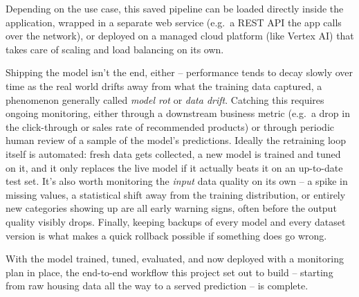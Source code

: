 \documentclass[11pt]{article}
\begin{document}
	Depending on the use case, this saved pipeline can be loaded directly inside the application, wrapped in a separate web service (e.g.\ a REST API the app calls over the network), or deployed on a managed cloud platform (like Vertex AI) that takes care of scaling and load balancing on its own.
	
	Shipping the model isn't the end, either -- performance tends to decay slowly over time as the real world drifts away from what the training data captured, a phenomenon generally called \emph{model rot} or \emph{data drift}. Catching this requires ongoing monitoring, either through a downstream business metric (e.g.\ a drop in the click-through or sales rate of recommended products) or through periodic human review of a sample of the model's predictions. Ideally the retraining loop itself is automated: fresh data gets collected, a new model is trained and tuned on it, and it only replaces the live model if it actually beats it on an up-to-date test set. It's also worth monitoring the \emph{input} data quality on its own -- a spike in missing values, a statistical shift away from the training distribution, or entirely new categories showing up are all early warning signs, often before the output quality visibly drops. Finally, keeping backups of every model and every dataset version is what makes a quick rollback possible if something does go wrong.
	
	With the model trained, tuned, evaluated, and now deployed with a monitoring plan in place, the end-to-end workflow this project set out to build -- starting from raw housing data all the way to a served prediction -- is complete.
	
\end{document}

